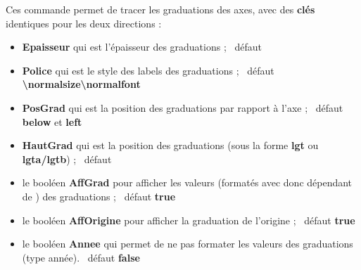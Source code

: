 \documentclass[a4paper,french,11pt]{article}
\newcommand\ctex[1]{\tcbox[vignettelatex]{#1}}
\newcommand\Cle[1]{{\bfseries\sffamily\textlangle #1\textrangle}}
\begin{document}

\begin{codetex}
\end{codetex}

\begin{codecles}
Ces commande permet de tracer les graduations des axes, avec des \Cle{clés} identiques pour les deux directions :

\begin{itemize}
	\item \Cle{Epaisseur} qui est l'épaisseur des graduations ; \hfill~défaut \Cle{1pt}
	\item \Cle{Police} qui est le style des labels des graduations ; \hfill~défaut \Cle{\textbackslash{}normalsize\textbackslash{}normalfont}
	\item \Cle{PosGrad} qui est la position des graduations par rapport à l'axe ; \hfill~défaut \Cle{below} et \Cle{left}
	\item \Cle{HautGrad} qui est la position des graduations (sous la forme \Cle{lgt} ou \Cle{lgta/lgtb}) ; \hfill~défaut \Cle{4pt}
	\item le booléen \Cle{AffGrad} pour afficher les valeurs (formatés avec \ctex{num} donc dépendant de \ctex{sisetup}) des graduations  ; \hfill~défaut \Cle{true}
	\item le booléen \Cle{AffOrigine} pour afficher la graduation de l'origine ; \hfill~défaut \Cle{true}
	\item le booléen \Cle{Annee} qui permet de ne pas formater les valeurs des graduations (type \textsf{année}). \hfill~défaut \Cle{false}
\end{itemize}
\end{codecles}

\begin{codetex}
	

\end{codetex}
\end{document}
